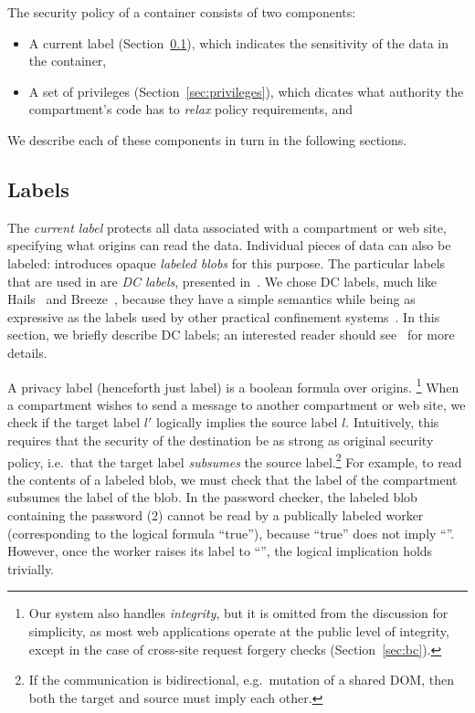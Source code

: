 The security policy of a container consists of two components:

\begin{itemize}
    \item A current label (Section~\ref{sec:labels}), which indicates the
        sensitivity of the data in the container,
    \item A set of privileges (Section~\ref{sec:privileges}), which
        dicates what authority the compartment's code has to
        \emph{relax} policy requirements, and
\end{itemize}

We describe each of these components in turn in the following sections.

\subsection{Labels}
\label{sec:labels}

The \emph{current label} protects all data associated with a compartment or
web site, specifying what origins can read the data.
%
Individual pieces of data can also be labeled: \sys{}
introduces opaque \emph{labeled blobs} for this purpose.
%
The particular labels that are used in \sys{} are \emph{DC labels},
presented in~\cite{stefan:2011:dclabels}.
%
We chose DC labels, much like Hails~\cite{giffin:2012:hails} and
Breeze~\cite{Breeze13}, because they have a simple
semantics while being as expressive as the labels used by other practical
confinement systems~\cite{GenLabels}.
%
In this section, we briefly describe DC labels; an interested
reader should see~\cite{stefan:2011:dclabels} for more details.

A privacy label (henceforth just label) is a boolean formula over
origins.%
%
\footnote{
  Our system also handles \emph{integrity}, but it is omitted from
  the discussion for simplicity, as most web applications operate at the
  public level of integrity, except in the case of cross-site request
  forgery checks (Section~\ref{sec:bc}).
}
%
When a compartment wishes to send a message to another compartment or
web site, we check if the target label $l'$ logically implies the source
label $l$.
%
Intuitively, this requires that the security of the destination be as strong as original security policy, i.e.\ that the target label \emph{subsumes} the source label.\footnote{If the communication is bidirectional, e.g.\ mutation of a shared DOM, then both the target and source must imply each other.}
%
For example, to read the contents of a labeled blob, we must check that
the label of the compartment subsumes the label of the blob.
%
In the password checker, the labeled blob containing the password (2)
cannot be read by a publically labeled worker (corresponding to the
logical formula ``true''), because ``true'' does not imply
``''.
%
However, once the worker raises its label to ``'', the
logical implication holds trivially.

